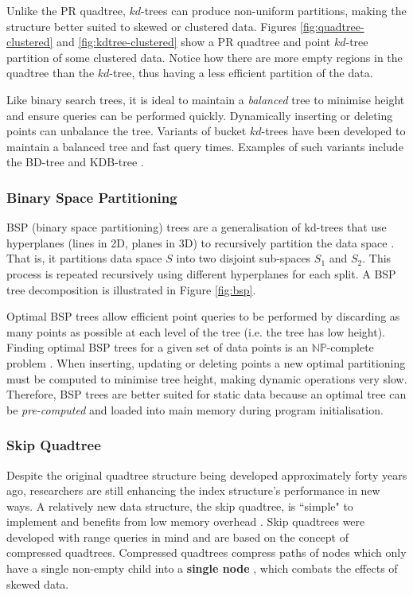 Unlike the PR quadtree, $kd$-trees can produce non-uniform partitions, making the structure better suited to skewed or clustered data. Figures \ref{fig:quadtree-clustered} and \ref{fig:kdtree-clustered} show a PR quadtree and point $kd$-tree partition of some clustered data. Notice how there are more empty regions in the quadtree than the $kd$-tree, thus having a less efficient partition of the data.

Like binary search trees, it is ideal to maintain a \textit{balanced} tree to minimise height and ensure queries can be performed quickly. Dynamically inserting or deleting points can unbalance the tree. Variants of bucket $kd$-trees have been developed to maintain a balanced tree and fast query times. Examples of such variants include the BD-tree \cite{kdtree-v-bdtree} and KDB-tree \cite{kdb-tree}.

\subsubsection{Binary Space Partitioning}

BSP (binary space partitioning) trees are a generalisation of kd-trees that use hyperplanes (lines in 2D, planes in 3D) to recursively partition the data space \cite{bsp-tree}. That is, it partitions data space $S$ into two disjoint sub-spaces $S_1$ and $S_2$. This process is repeated recursively using different hyperplanes for each split. A BSP tree decomposition is illustrated in Figure \ref{fig:bsp}.

Optimal BSP trees allow efficient point queries to be performed by discarding as many points as possible at each level of the tree (i.e. the tree has low height). Finding optimal BSP trees for a given set of data points is an $\mathbb{NP}$-complete problem \cite{bsp-np-hard}. When inserting, updating or deleting points a new optimal partitioning must be computed to minimise tree height, making dynamic operations very slow. Therefore, BSP trees are better suited for static data because an optimal tree can be \textit{pre-computed} and loaded into main memory during program initialisation.

\subsubsection{Skip Quadtree}

Despite the original quadtree structure being developed approximately forty years ago, researchers are still enhancing the index structure's performance in new ways. A relatively new data structure, the skip quadtree, is ``simple" to implement and benefits from low memory overhead \cite{skip-quadtree}. Skip quadtrees were developed with range queries in mind and are based on the concept of compressed quadtrees. Compressed quadtrees compress paths of nodes which only have a single non-empty child into a \textbf{single node} \cite{compressed-quadtree}, which combats the effects of skewed data.


